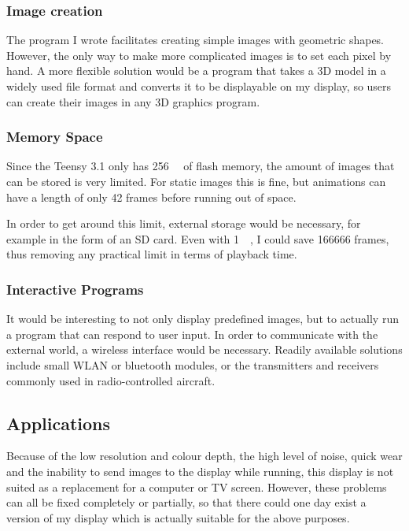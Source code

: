\documentclass[a4paper, 11pt, titlepage]{article}
\begin{document}
\subsubsection{Image creation}

The program I wrote facilitates creating simple images with geometric shapes. However, the only
way to make more complicated images is to set each pixel by hand. A more flexible solution would
be a program that takes a 3D model in a widely used file format and converts it to be displayable
on my display, so users can create their images in any 3D graphics program.


\subsubsection{Memory Space}

Since the Teensy 3.1 only has \SI{256}{\kilo\byte} of flash memory, the amount of images that can
be stored is very limited. For static images this is fine, but animations can have a length of
only 42 frames before running out of space.

In order to get around this limit, external storage would be necessary, for example in the form of
an SD card. Even with \SI{1}{\giga\byte}, I could save 166666 frames, thus removing any practical
limit in terms of playback time.


\subsubsection{Interactive Programs}

It would be interesting to not only display predefined images, but to actually run a program that
can respond to user input. In order to communicate with the external world, a wireless interface
would be necessary. Readily available solutions include small WLAN or bluetooth modules, or the
transmitters and receivers commonly used in radio-controlled aircraft.

\subsection{Applications}

Because of the low resolution and colour depth, the high level of noise, quick wear and the
inability to send images to the display while running, this display is not suited as a replacement
for a computer or TV screen. However, these problems can all be fixed completely or partially, so
that there could one day exist a version of my display which is actually suitable for the above
purposes.
\end{document}
